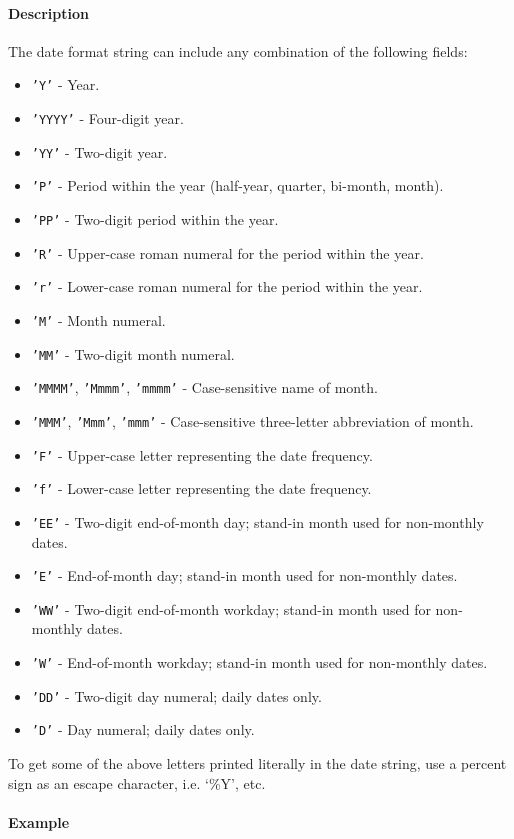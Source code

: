 \paragraph{Description}\label{description}

The date format string can include any combination of the following
fields:

\begin{itemize}
\item
  \texttt{'Y'} - Year.
\item
  \texttt{'YYYY'} - Four-digit year.
\item
  \texttt{'YY'} - Two-digit year.
\item
  \texttt{'P'} - Period within the year (half-year, quarter, bi-month,
  month).
\item
  \texttt{'PP'} - Two-digit period within the year.
\item
  \texttt{'R'} - Upper-case roman numeral for the period within the
  year.
\item
  \texttt{'r'} - Lower-case roman numeral for the period within the
  year.
\item
  \texttt{'M'} - Month numeral.
\item
  \texttt{'MM'} - Two-digit month numeral.
\item
  \texttt{'MMMM'}, \texttt{'Mmmm'}, \texttt{'mmmm'} - Case-sensitive
  name of month.
\item
  \texttt{'MMM'}, \texttt{'Mmm'}, \texttt{'mmm'} - Case-sensitive
  three-letter abbreviation of month.
\item
  \texttt{'F'} - Upper-case letter representing the date frequency.
\item
  \texttt{'f'} - Lower-case letter representing the date frequency.
\item
  \texttt{'EE'} - Two-digit end-of-month day; stand-in month used for
  non-monthly dates.
\item
  \texttt{'E'} - End-of-month day; stand-in month used for non-monthly
  dates.
\item
  \texttt{'WW'} - Two-digit end-of-month workday; stand-in month used
  for non-monthly dates.
\item
  \texttt{'W'} - End-of-month workday; stand-in month used for
  non-monthly dates.
\item
  \texttt{'DD'} - Two-digit day numeral; daily dates only.
\item
  \texttt{'D'} - Day numeral; daily dates only.
\end{itemize}

To get some of the above letters printed literally in the date string,
use a percent sign as an escape character, i.e. `\%Y', etc.

\paragraph{Example}\label{example}



